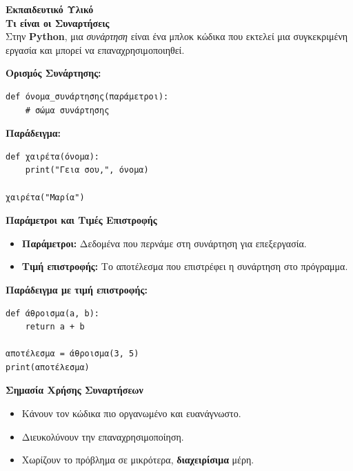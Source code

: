 \documentclass[11pt]{report}
\begin{document}
\vspace{1em}
\textbf{Εκπαιδευτικό Υλικό} \\
\textbf{Τι είναι οι Συναρτήσεις} \\[0.5em]
Στην \textbf{Python}, μια \textit{συνάρτηση} είναι ένα μπλοκ κώδικα που εκτελεί μια συγκεκριμένη εργασία και μπορεί να επαναχρησιμοποιηθεί.

\textbf{Ορισμός Συνάρτησης:}
\begin{tcolorbox}[colback=gray!5!white, colframe=black!75!black]
\begin{verbatim}
def όνομα_συνάρτησης(παράμετροι):
    # σώμα συνάρτησης
\end{verbatim}
\end{tcolorbox}

\textbf{Παράδειγμα:}
\begin{tcolorbox}[colback=gray!5!white, colframe=black!75!black]
\begin{verbatim}
def χαιρέτα(όνομα):
    print("Γεια σου,", όνομα)

χαιρέτα("Μαρία")
\end{verbatim}
\end{tcolorbox}

\textbf{Παράμετροι και Τιμές Επιστροφής} \\[0.5em]
\begin{itemize}
    \item \textbf{Παράμετροι:} Δεδομένα που περνάμε στη συνάρτηση για επεξεργασία.
    \item \textbf{Τιμή επιστροφής:} Το αποτέλεσμα που επιστρέφει η συνάρτηση στο πρόγραμμα.
\end{itemize}

\textbf{Παράδειγμα με τιμή επιστροφής:}
\begin{tcolorbox}[colback=gray!5!white, colframe=black!75!black]
\begin{verbatim}
def άθροισμα(a, b):
    return a + b

αποτέλεσμα = άθροισμα(3, 5)
print(αποτέλεσμα)
\end{verbatim}
\end{tcolorbox}

\textbf{Σημασία Χρήσης Συναρτήσεων}
\begin{itemize}
    \item Κάνουν τον κώδικα πιο οργανωμένο και ευανάγνωστο.
    \item Διευκολύνουν την επαναχρησιμοποίηση.
    \item Χωρίζουν το πρόβλημα σε μικρότερα, \textbf{διαχειρίσιμα} μέρη.
\end{itemize}
\end{document}
